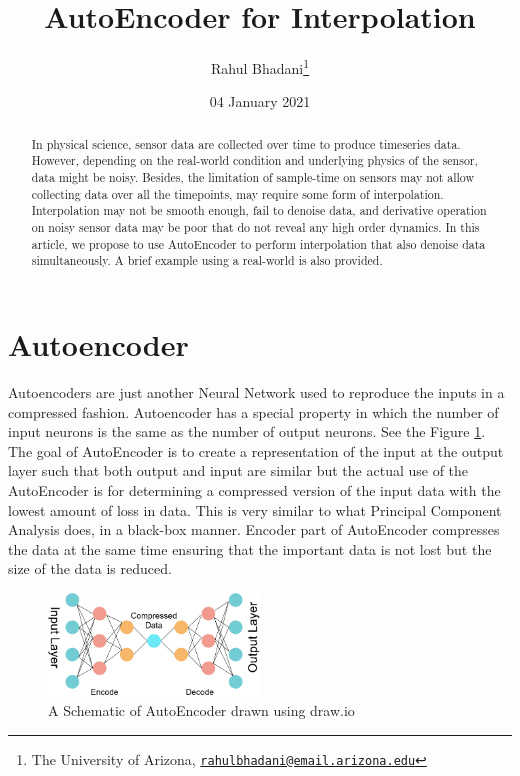 \documentclass[onecolumn]{article}
\title{AutoEncoder for Interpolation}
\author{Rahul Bhadani\footnote{The University of Arizona,
  \href{mailto:rahulbhadani@email.arizona.edu}{\nolinkurl{rahulbhadani@email.arizona.edu}}}}
\date{04 January 2021}
\begin{document}
\maketitle
\begin{abstract}
In physical science, sensor data are collected over time to produce
timeseries data. However, depending on the real-world condition and
underlying physics of the sensor, data might be noisy. Besides, the
limitation of sample-time on sensors may not allow collecting data over
all the timepoints, may require some form of interpolation.
Interpolation may not be smooth enough, fail to denoise data, and
derivative operation on noisy sensor data may be poor that do not reveal
any high order dynamics. In this article, we propose to use AutoEncoder
to perform interpolation that also denoise data simultaneously. A brief
example using a real-world is also provided.
\end{abstract}

\section{Autoencoder}\label{autoencoder}

Autoencoders \citep{ballard1987modular} are just another Neural Network
used to reproduce the inputs in a compressed fashion. Autoencoder has a
special property in which the number of input neurons is the same as the
number of output neurons. See the Figure \ref{neuralnet}. The goal of
AutoEncoder is to create a representation of the input at the output
layer such that both output and input are similar but the actual use of
the AutoEncoder is for determining a compressed version of the input
data with the lowest amount of loss in data. This is very similar to
what Principal Component Analysis does, in a black-box manner. Encoder
part of AutoEncoder compresses the data at the same time ensuring that
the important data is not lost but the size of the data is reduced.

\begin{figure}
\centering
\includegraphics[width=0.50000\textwidth]{neuralnet.png}
\caption{A Schematic of AutoEncoder drawn using
draw.io\label{neuralnet}}
\end{figure}
\end{document}
